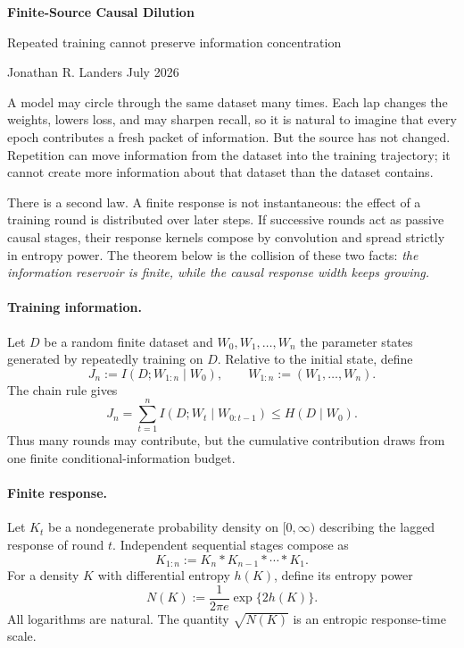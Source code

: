 \documentclass[10pt]{article}
\theoremstyle{compact}
\newcommand{\EP}{N}
\begin{document}
\begin{center}
{\LARGE\bfseries Finite-Source Causal Dilution}\par
\vspace{0.18em}
{\large Repeated training cannot preserve information concentration}\par
\vspace{0.55em}
{Jonathan R. Landers \qquad July 2026}
\end{center}
\vspace{0.25em}

A model may circle through the same dataset many times. Each lap changes the weights, lowers loss, and may sharpen recall, so it is natural to imagine that every epoch contributes a fresh packet of information. But the source has not changed. Repetition can move information from the dataset into the training trajectory; it cannot create more information about that dataset than the dataset contains.

There is a second law. A finite response is not instantaneous: the effect of a training round is distributed over later steps. If successive rounds act as passive causal stages, their response kernels compose by convolution and spread strictly in entropy power. The theorem below is the collision of these two facts: \emph{the information reservoir is finite, while the causal response width keeps growing.}

\paragraph{Training information.}
Let $D$ be a random finite dataset and $W_0,W_1,\ldots,W_n$ the parameter states generated by repeatedly training on $D$. Relative to the initial state, define
\[
J_n:=I(D;W_{1:n}\mid W_0),
\qquad W_{1:n}:=(W_1,\ldots,W_n).
\]
The chain rule gives
\[
J_n=\sum_{t=1}^{n}I(D;W_t\mid W_{0:t-1})
\le H(D\mid W_0).
\tag{1}
\]
Thus many rounds may contribute, but the cumulative contribution draws from one finite conditional-information budget.

\paragraph{Finite response.}
Let $K_t$ be a nondegenerate probability density on $[0,\infty)$ describing the lagged response of round $t$. Independent sequential stages compose as
\[
K_{1:n}:=K_n*K_{n-1}*\cdots*K_1.
\tag{2}
\]
For a density $K$ with differential entropy $h(K)$, define its entropy power
\[
\EP(K):=\frac{1}{2\pi e}\exp\{2h(K)\}.
\tag{3}
\]
All logarithms are natural. The quantity $\sqrt{\EP(K)}$ is an entropic response-time scale.
\end{document}
